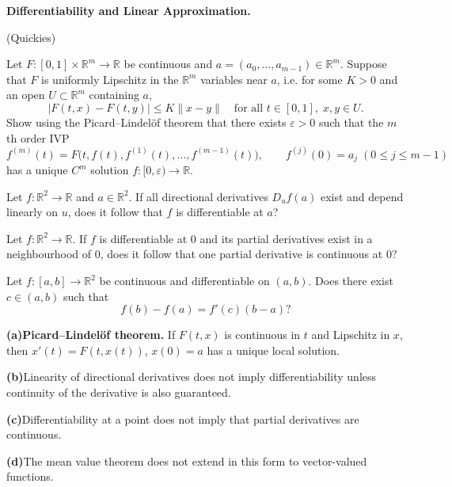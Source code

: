 \begin{problem}[CP-II-0260]
\label{prob:cp-ii-0260}
\textbf{Differentiability and Linear Approximation.}

\hspace*{1.5em}(Quickies)

Let $F:[0,1]\times\mathbb{R}^m\to\mathbb{R}$ be continuous and
$a=(a_0,\dots,a_{m-1})\in\mathbb{R}^m$.
Suppose that $F$ is uniformly Lipschitz in the $\mathbb{R}^m$ variables near $a$,
i.e. for some $K>0$ and an open $U\subset\mathbb{R}^m$ containing $a$,
\[
|F(t,x)-F(t,y)|\le K\|x-y\|\quad\text{for all }t\in[0,1],\;x,y\in U.
\]
Show using the Picard--Lindel\"of theorem that there exists $\varepsilon>0$ such that
the $m$th order IVP
\[
f^{(m)}(t)=F\bigl(t,f(t),f^{(1)}(t),\ldots,f^{(m-1)}(t)\bigr),\qquad
f^{(j)}(0)=a_j\;(0\le j\le m-1)
\]
has a unique $C^m$ solution $f:[0,\varepsilon)\to\mathbb{R}$.

Let $f:\mathbb{R}^2\to\mathbb{R}$ and $a\in\mathbb{R}^2$.
If all directional derivatives $D_u f(a)$ exist and depend linearly on $u$,
does it follow that $f$ is differentiable at $a$?

Let $f:\mathbb{R}^2\to\mathbb{R}$.
If $f$ is differentiable at $0$ and its partial derivatives exist in a neighbourhood of $0$,
does it follow that one partial derivative is continuous at $0$?

Let $f:[a,b]\to\mathbb{R}^2$ be continuous and differentiable on $(a,b)$.
Does there exist $c\in(a,b)$ such that
\[
f(b)-f(a)=f'(c)(b-a)?
\]

\bigskip
\bigskip

 \setlength{\itemsep}{6pt}
	\par\smallskip\noindent\textbf{(a)}\quad \textbf{Picard--Lindel\"of theorem.}
	If $F(t,x)$ is continuous in $t$ and Lipschitz in $x$, then $x'(t)=F(t,x(t))$, $x(0)=a$
	has a unique local solution.
	\par\smallskip\noindent\textbf{(b)}\quad Linearity of directional derivatives does not imply differentiability unless continuity of the derivative is also guaranteed.
	\par\smallskip\noindent\textbf{(c)}\quad Differentiability at a point does not imply that partial derivatives are continuous.
	\par\smallskip\noindent\textbf{(d)}\quad The mean value theorem does not extend in this form to vector-valued functions.

\bigskip
\end{problem}

